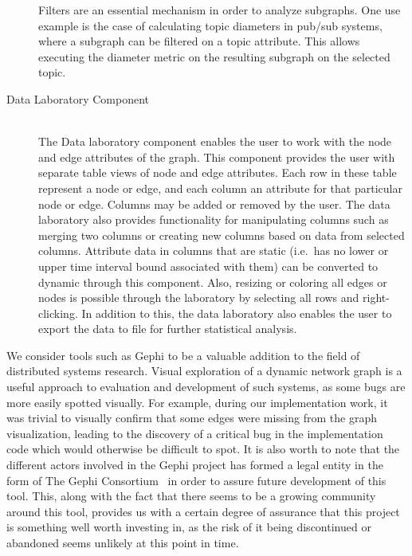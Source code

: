\begin{description}
    Filters are an essential mechanism in order to analyze subgraphs.
    One use example is the case of calculating topic diameters in pub/sub systems,
    where a subgraph can be filtered on a topic attribute. This
    allows executing the diameter metric on the resulting subgraph
    on the selected topic.

\item[Data Laboratory Component] \hfill \\

    The Data laboratory component enables the user to work with the node
    and edge attributes of the graph. This component provides the user
    with separate table views of node and edge attributes. Each row in
    these table represent a node or edge, and each column an attribute
    for that particular node or edge. Columns may be added or removed by
    the user. The data laboratory also provides functionality for
    manipulating columns such as merging two columns or creating new
    columns based on data from selected columns. Attribute data in
    columns that are static (i.e.\ has no lower or upper time interval
    bound associated with them) can be converted to dynamic through this
    component. Also, resizing or coloring all edges or nodes is possible
    through the laboratory by selecting all rows and right-clicking. In
    addition to this, the data laboratory also enables the user to export the
    data to file for further statistical analysis.

\end{description}

We consider tools such as Gephi to be a valuable addition to the field
of distributed systems research. Visual exploration of a dynamic network graph
is a useful approach to evaluation and development of such systems, as
some bugs are more easily spotted visually. For example, during our
implementation work, it was trivial to visually confirm that some edges
were missing from the graph visualization, leading to the discovery of a critical bug
in the implementation code which would otherwise be difficult to spot.
It is also worth to note that the different actors involved in the Gephi
project has formed a legal entity in the form of The Gephi
Consortium~\cite{gephi-consortium} in order to assure future development
of this tool. This, along with the fact that there seems to be a growing
community around this tool, provides us with a certain degree of assurance that
this project is something well worth investing in, as the risk of it
being discontinued or abandoned seems unlikely at this point in time.

